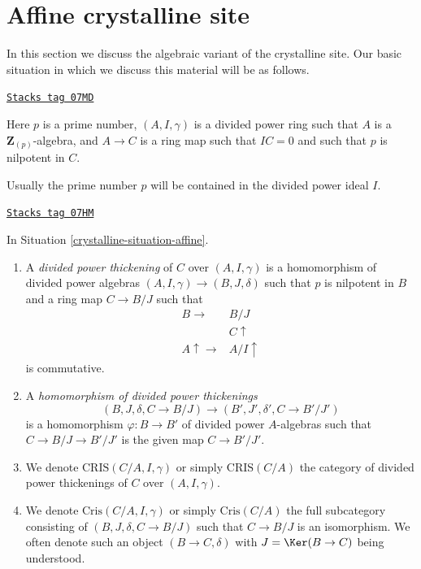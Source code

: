 \section{Affine crystalline site}
\label{crystalline-section-affine-site}
In this section we discuss the algebraic variant of the crystalline site.
Our basic situation in which we discuss this material will be as
follows.

\begin{definition}
\label{crystalline-situation-affine}
\href{https://stacks.math.columbia.edu/tag/07MD}{\texttt{Stacks tag 07MD}}

Here $p$ is a prime number, $(A, I, \gamma)$ is a divided power
ring such that $A$ is a $\mathbf{Z}_{(p)}$-algebra, and $A \to C$ is a
ring map such that $IC = 0$ and such that $p$ is nilpotent in $C$.
\end{definition}

Usually the prime number $p$ will be contained in the
divided power ideal $I$.

\begin{definition}
\label{crystalline-definition-affine-thickening}
\href{https://stacks.math.columbia.edu/tag/07HM}{\texttt{Stacks tag 07HM}}

In Situation \ref{crystalline-situation-affine}.
\begin{enumerate}
\item A {\it divided power thickening} of $C$ over $(A, I, \gamma)$
is a homomorphism of divided power algebras $(A, I, \gamma) \to (B, J, \delta)$
such that $p$ is nilpotent in $B$ and a ring map $C \to B/J$ such that
$$
\begin{array}{cc}B \longrightarrow & B/J \\  & C \uparrow \\ A \uparrow\longrightarrow & A/I \uparrow\end{array}
$$
is commutative.
\item A {\it homomorphism of divided power thickenings}
$$
(B, J, \delta, C \to B/J) \longrightarrow (B', J', \delta', C \to B'/J')
$$
is a homomorphism $\varphi : B \to B'$ of divided power $A$-algebras such
that $C \to B/J \to B'/J'$ is the given map $C \to B'/J'$.
\item We denote $\text{CRIS}(C/A, I, \gamma)$ or simply $\text{CRIS}(C/A)$
the category of divided power thickenings of $C$ over $(A, I, \gamma)$.
\item We denote $\text{Cris}(C/A, I, \gamma)$ or simply $\text{Cris}(C/A)$
the full subcategory consisting of $(B, J, \delta, C \to B/J)$ such that
$C \to B/J$ is an isomorphism. We often denote such an object
$(B \to C, \delta)$ with $J = \Ker(B \to C)$ being understood.
\end{enumerate}
\end{definition}

